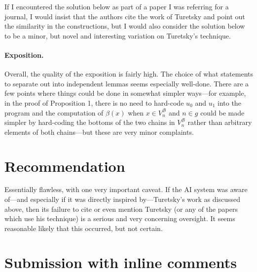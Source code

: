 \documentclass[12pt]{article}
\begin{document}
If I encountered the solution below as part of a paper I was referring for a journal, I would insist that the authors cite the work of Turetsky and point out the similarity in the constructions, but I would also consider the solution below to be a minor, but novel and interesting variation on Turetsky's technique.

\paragraph{Exposition.}
Overall, the quality of the exposition is fairly high. The choice of what statements to separate out into independent lemmas seems especially well-done. There are a few points where things could be done in somewhat simpler ways---for example, in the proof of Proposition 1, there is no need to hard-code $u_0$ and $u_1$ into the program and the computation of $\beta(x)$ when $x \in V_n^\mathcal{B}$ and $n \in g$ could be made simpler by hard-coding the bottoms of the two chains in $V_n^\mathcal{B}$ rather than arbitrary elements of both chains---but these are very minor complaints. 

\section{Recommendation}
Essentially flawless, with one very important caveat. If the AI system was aware of---and especially if it was directly inspired by---Turetsky's work as discussed above, then its failure to cite or even mention Turetsky (or any of the papers which use his technique) is a serious and very concerning oversight. It seems reasonable likely that this occurred, but not certain.


  \section{Submission with inline comments}

%
\date{}



\begin{abstract}
We answer the question affirmatively.  We build a computable countable
structure $\mathcal A$ such that every automorphism of every copy of
$\mathcal A$ is computable from that copy, but for every finite tuple of
parameters $\bar a$ there is an automorphism $\pi$ whose graph is not
$\Sigma^{\mathrm{in}}_1$-definable over $\bar a\cup\pi(\bar a)$.
\end{abstract}
\end{document}
